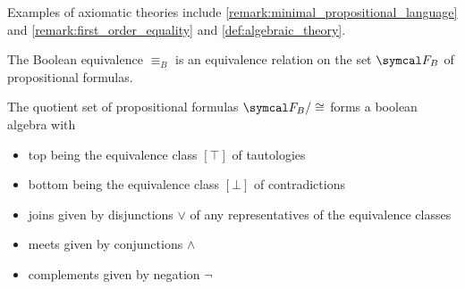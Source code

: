 \begin{example}\label{ex:axiomatic_theory}
  Examples of axiomatic theories include \cref{remark:minimal_propositional_language} and \cref{remark:first_order_equality} and \cref{def:algebraic_theory}.
\end{example}

\begin{proposition}\label{thm:boolean_equivalence_relation}
  The Boolean equivalence \( \equiv_B \) is an equivalence relation on the set \( \Cal{F}_B \) of propositional formulas.
\end{proposition}

\begin{theorem}\label{thm:propositional_logic_boolean_algebra}
  The quotient set of propositional formulas \( \Cal{F}_B / \cong \) forms a boolean algebra with
  \begin{itemize}
    \item top being the equivalence class \( [\top] \) of tautologies
    \item bottom being the equivalence class \( [\bot] \) of contradictions
    \item joins given by disjunctions \( \lor \) of any representatives of the equivalence classes
    \item meets given by conjunctions \( \land \)
    \item complements given by negation \( \neg \)
  \end{itemize}
\end{theorem}
